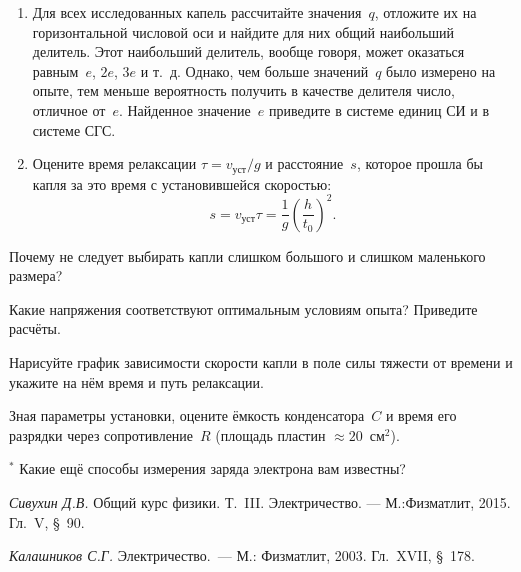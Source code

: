 \begin{lab:task}
\begin{enumerate}
\end{enumerate}


\begin{enumerate}

\item{Для всех исследованных капель рассчитайте значения~$q$, отложите их на
горизонтальной числовой оси и найдите для них общий наибольший делитель. Этот
наибольший делитель, вообще говоря, может оказаться равным~$e$, $2e$, $3e$ и
т.~д. Однако, чем больше значений~$q$ было измерено на опыте, тем меньше
вероятность получить в качестве делителя число, отличное от~$e$. Найденное
значение~$e$ приведите в системе единиц СИ и в системе СГС.}

\item{Оцените время релаксации $\tau=v_\text{уст}/g$ и расстояние~$s$, которое
прошла бы капля за это время с установившейся скоростью:
\begin{equation*}
	s=v_\text{уст}\tau=\frac{1}{g}\left(\frac{h}{t_0}\right)^2.
\end{equation*}}

\end{enumerate}

\end{lab:task}

\begin{lab:questions}

\item{Почему не следует выбирать капли слишком большого и слишком маленького
размера?}

\item{Какие напряжения соответствуют оптимальным условиям опыта? Приведите
расчёты.}

\item{Нарисуйте график зависимости скорости капли в поле силы тяжести от времени
и укажите на нём время и путь релаксации.}

\item{Зная параметры установки, оцените ёмкость конденсатора~$C$ и время его
разрядки через сопротивление~$R$ (площадь пластин ${\approx} 20$~см$^2$).}

\item{$^*$ Какие ещё способы измерения заряда электрона вам известны?}

\end{lab:questions}

\begin{lab:literature}

\item{ \emph{Сивухин Д.В.} Общий курс физики. Т.~III. Электричество. ---
М.:Физматлит, 2015. Гл.~V, \S~90.}

\item{ \emph{Калашников С.Г.} Электричество.~--- М.: Физматлит, 2003. Гл.~XVII,
\S~178.}

\end{lab:literature}
